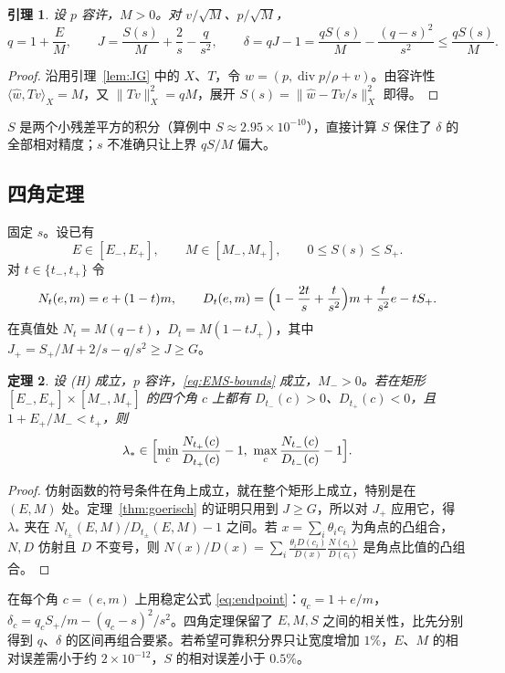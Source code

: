 \documentclass[11pt,a4paper,fontset=fandol]{ctexart}
\theoremstyle{plain}
\newtheorem{theorem}{定理}[section]
\newtheorem{lemma}[theorem]{引理}
\theoremstyle{definition}
\theoremstyle{remark}
\begin{document}
\begin{lemma}
\label{lem:normalization}
设 $p$ 容许，$M>0$。对 $v/\sqrt M$、$p/\sqrt M$，
\[
q=1+\frac EM,\qquad J=\frac{S(s)}M+\frac2s-\frac q{s^2},\qquad\delta=qJ-1=\frac{qS(s)}M-\frac{(q-s)^2}{s^2}\le\frac{qS(s)}M .
\]
\end{lemma}

\begin{proof}
沿用引理~\ref{lem:JG} 中的 $X$、$T$，令 $\hat w=(p,\operatorname{div}p/\rho+v)$。由容许性 $\langle\hat w,Tv\rangle_X=M$，又 $\|Tv\|_X^2=qM$，展开 $S(s)=\|\hat w-Tv/s\|_X^2$ 即得。
\end{proof}

$S$ 是两个小残差平方的积分（算例中 $S\approx2.95\times10^{-10}$），直接计算 $S$ 保住了 $\delta$ 的全部相对精度；$s$ 不准确只让上界 $qS/M$ 偏大。

\subsection{四角定理}

固定 $s$。设已有
\begin{equation}
\label{eq:EMS-bounds}
E\in[E_-,E_+],\qquad M\in[M_-,M_+],\qquad 0\le S(s)\le S_+ .
\end{equation}
对 $t\in\{t_-,t_+\}$ 令
\[
N_t(e,m)=e+(1-t)m,\qquad D_t(e,m)=\Bigl(1-\frac{2t}s+\frac t{s^2}\Bigr)m+\frac t{s^2}e-tS_+ .
\]
在真值处 $N_t=M(q-t)$，$D_t=M(1-tJ_+)$，其中 $J_+=S_+/M+2/s-q/s^2\ge J\ge G$。

\begin{theorem}
\label{thm:four-corner}
设 (H) 成立，$p$ 容许，\eqref{eq:EMS-bounds} 成立，$M_->0$。若在矩形 $[E_-,E_+]\times[M_-,M_+]$ 的四个角 $c$ 上都有 $D_{t_-}(c)>0$、$D_{t_+}(c)<0$，且 $1+E_+/M_-<t_+$，则
\[
\lambda_*\in\Bigl[\min_c\frac{N_{t_+}(c)}{D_{t_+}(c)}-1,\ \max_c\frac{N_{t_-}(c)}{D_{t_-}(c)}-1\Bigr].
\]
\end{theorem}

\begin{proof}
仿射函数的符号条件在角上成立，就在整个矩形上成立，特别是在 $(E,M)$ 处。定理~\ref{thm:goerisch} 的证明只用到 $J\ge G$，所以对 $J_+$ 应用它，得 $\lambda_*$ 夹在 $N_{t_\pm}(E,M)/D_{t_\pm}(E,M)-1$ 之间。若 $x=\sum_i\theta_ic_i$ 为角点的凸组合，$N,D$ 仿射且 $D$ 不变号，则 $N(x)/D(x)=\sum_i\frac{\theta_iD(c_i)}{D(x)}\frac{N(c_i)}{D(c_i)}$ 是角点比值的凸组合。
\end{proof}

在每个角 $c=(e,m)$ 上用稳定公式 \eqref{eq:endpoint}：$q_c=1+e/m$，$\delta_c=q_cS_+/m-(q_c-s)^2/s^2$。四角定理保留了 $E,M,S$ 之间的相关性，比先分别得到 $q$、$\delta$ 的区间再组合要紧。若希望可靠积分界只让宽度增加 $1\%$，$E$、$M$ 的相对误差需小于约 $2\times10^{-12}$，$S$ 的相对误差小于 $0.5\%$。
\end{document}
